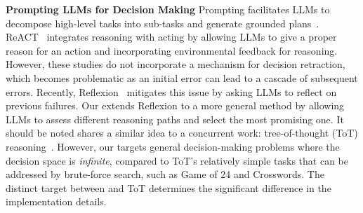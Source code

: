 \textbf{Prompting LLMs for Decision Making} \quad
Prompting facilitates LLMs to decompose high-level tasks into sub-tasks and generate grounded plans~\citep{ahn2022can,huang2022language,huang2022inner,ye2023large}. ReACT~\citep{yao2022react} integrates reasoning with acting by allowing LLMs to give a proper reason for an action and incorporating environmental feedback for reasoning. However, these studies do not incorporate a mechanism for decision retraction, which becomes problematic as an initial error can lead to a cascade of subsequent errors. Recently, Reflexion~\citep{shinn2023reflexion} mitigates this issue by asking LLMs to reflect on previous failures. Our \dfs extends Reflexion to a more general method by allowing LLMs to assess different reasoning paths and select the most promising one. It should be noted \dfs shares a similar idea to a concurrent work: tree-of-thought (ToT) reasoning~\citep{yao2023tree}. However, our \dfs targets general decision-making problems where the decision space is \textit{infinite}, compared to ToT's relatively simple tasks that can be addressed by brute-force search, such as Game of 24 and Crosswords. The distinct target between \dfs and ToT determines the significant difference in the implementation details.


